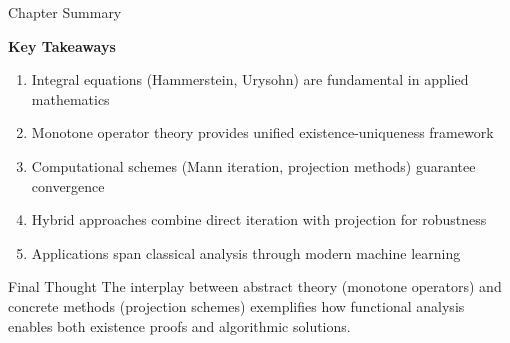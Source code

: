 \documentclass[aspectratio=169,10pt]{beamer}
\begin{document}
\begin{frame}{Chapter Summary}
    \begin{center}
        \Large
        \textbf{Key Takeaways}
    \end{center}

    \vspace{0.5cm}
    \begin{enumerate}
        \item Integral equations (Hammerstein, Urysohn) are fundamental in applied mathematics

        \vspace{0.3cm}
        \item Monotone operator theory provides unified existence-uniqueness framework

        \vspace{0.3cm}
        \item Computational schemes (Mann iteration, projection methods) guarantee convergence

        \vspace{0.3cm}
        \item Hybrid approaches combine direct iteration with projection for robustness

        \vspace{0.3cm}
        \item Applications span classical analysis through modern machine learning
    \end{enumerate}

    \vspace{0.8cm}
    \begin{block}{Final Thought}
        The interplay between abstract theory (monotone operators) and concrete methods
        (projection schemes) exemplifies how functional analysis enables both existence
        proofs and algorithmic solutions.
    \end{block}
\end{frame}
\end{document}
